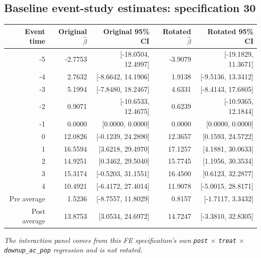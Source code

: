 \documentclass[10pt]{article}
\begin{document}
\subsection*{Baseline event-study estimates: specification 30}
\begin{center}
\scriptsize
\begin{tabular}{r rr rr}
\toprule
Event time & Original $\hat\beta$ & Original 95\% CI & Rotated $\hat\beta$ & Rotated 95\% CI \\
\midrule
-5 & -2.7753 & [-18.0504, 12.4997] & -3.9079 & [-19.1829, 11.3671] \\
-4 & 2.7632 & [-8.6642, 14.1906] & 1.9138 & [-9.5136, 13.3412] \\
-3 & 5.1994 & [-7.8480, 18.2467] & 4.6331 & [-8.4143, 17.6805] \\
-2 & 0.9071 & [-10.6533, 12.4675] & 0.6239 & [-10.9365, 12.1844] \\
-1 & 0.0000 & [0.0000, 0.0000] & 0.0000 & [0.0000, 0.0000] \\
0 & 12.0826 & [-0.1239, 24.2890] & 12.3657 & [0.1593, 24.5722] \\
1 & 16.5594 & [3.6218, 29.4970] & 17.1257 & [4.1881, 30.0633] \\
2 & 14.9251 & [0.3462, 29.5040] & 15.7745 & [1.1956, 30.3534] \\
3 & 15.3174 & [-0.5203, 31.1551] & 16.4500 & [0.6123, 32.2877] \\
4 & 10.4921 & [-6.4172, 27.4014] & 11.9078 & [-5.0015, 28.8171] \\
\midrule
Pre average & 1.5236 & [-8.7557, 11.8029] & 0.8157 & [-1.7117, 3.3432] \\
Post average & 13.8753 & [3.0534, 24.6972] & 14.7247 & [-3.3810, 32.8305] \\
\bottomrule
\end{tabular}
\end{center}
\medskip
\textit{The interaction panel comes from this FE specification's own \texttt{post} $\times$ \texttt{treat} $\times$ \texttt{downup\_ac\_pop} regression and is not rotated.}
\clearpage
\end{document}
